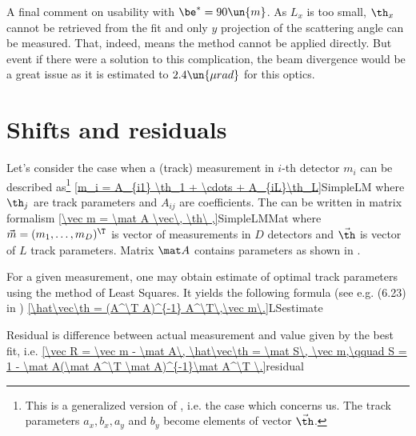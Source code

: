 A final comment on usability with $\be^*=90\un{m}$. As $L_x$ is too small, $\th_x$ cannot be retrieved from the fit and only $y$ projection of the scattering angle can be measured. That, indeed, means the method cannot be applied directly. But event if there were a solution to this complication, the beam divergence would be a great issue as it is estimated to $2.4\un{\mu rad}$ for this optics.

\bmfig[\flab{cdf method}Left: Simulation of measured $t$ distribution for Islam model, $\be^*=1540\un{m}$ optics ($L_x = 100\un{m}, L_y = 250\un{m}$) and various misalignments. Middle and right: $\De_x$ versus slope fit result.]
\emfig

\PrintReferences



\vfil\eject


\section{Shifts and residuals}

Let's consider the case when a (track) measurement in $i$-th detector $m_i$ can be described as\footnote{%
This is a generalized version of , i.e. the case which concerns us. The track parameters $a_x, b_x, a_y$ and $b_y$ become elements of vector $\vec\th$.
}
\eqref{m_i = A_{i1} \th_1 + \cdots + A_{iL}\th_L}{SimpleLM}
where $\th_j$ are track parameters and $A_{ij}$ are coefficients. The  can be written in matrix formalism
\eqref{\vec m = \mat A \vec\, \th\ ,}{SimpleLMMat}
where $\vec m = (m_1,\ldots,m_D)^\T$ is vector of measurements in $D$ detectors and $\vec\th$ is vector of $L$ track parameters. Matrix $\mat A$ contains parameters as shown in .

For a given measurement, one may obtain estimate of optimal track parameters using the method of Least Squares. It yields the following formula (see e.g. (6.23) in )
\eqref{\hat\vec\th = (A^\T A)^{-1} A^\T\,\vec m\.}{LSestimate}

Residual is difference between actual measurement and value given by the best fit, i.e.
\eqref{\vec R = \vec m - \mat A\, \hat\vec\th = \mat S\, \vec m,\qquad S = 1 - \mat A(\mat A^\T \mat A)^{-1}\mat A^\T \.}{residual}

